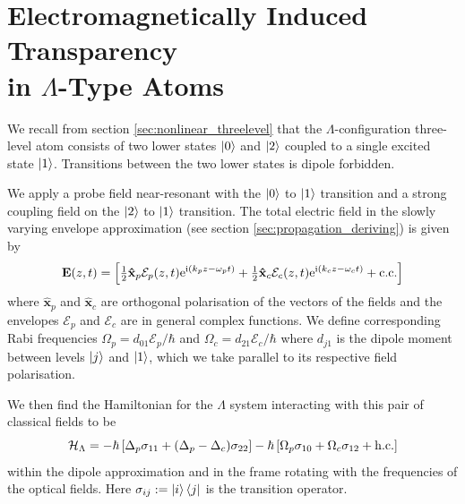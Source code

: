 \section[Electromagnetically Induced Transparency in $\Lambda$-Type Atoms]
  {Electromagnetically Induced Transparency\\ in $\Lambda$-Type Atoms}
  \label{sec:polaritons_eit}

    We recall from section \ref{sec:nonlinear_threelevel} that the
    $\Lambda$-configuration three-level atom consists of two lower states
    $\Ket{0}$ and $\Ket{2}$ coupled to a single excited state $\Ket{1}$.
    Transitions between the two lower states is dipole forbidden.

    We apply a probe field near-resonant with the $\Ket{0}$ to $\Ket{1}$
    transition and a strong coupling field on the $\Ket{2}$ to $\Ket{1}$
    transition. The total electric field in the slowly varying envelope
    approximation (see section \ref{sec:propagation_deriving}) is given by 
    \begin{equation}
      \mathbf{E}(z,t) = \left[ \tfrac{1}{2} \mathbf{\hat{x}}_p 
        \mathcal{E}_p(z,t) \mathrm{e}^{\mathrm{i}(k_p z - \omega_p t)} + 
        \tfrac{1}{2} \mathbf{\hat{x}}_c \mathcal{E}_c(z,t) \mathrm{e}^{\mathrm{i}(k_c z -
        \omega_c t)} + \mathrm{c.c.} \right]
      \label{eqn:lambda_field}
    \end{equation}
   where $\mathbf{\hat{x}}_p$ and $\mathbf{\hat{x}}_c$ are orthogonal
    polarisation of the vectors of the fields and the envelopes $\mathcal{E}_p$
    and $\mathcal{E}_c$ are in general complex functions. We define
    corresponding Rabi frequencies $\Omega_p = d_{01}\mathcal{E}_p/\hbar$ and
    $\Omega_c = d_{21}\mathcal{E}_c/\hbar$ where $d_{j1}$ is the dipole moment
    between levels $\Ket{j}$ and $\Ket{1}$, which we take parallel to its
    respective field polarisation.

    We then find the Hamiltonian for the $\Lambda$ system interacting with this
    pair of classical fields to be\cite{Fleischhauer2005}
    \begin{equation}
      \mathcal{H}_\mathrm{\Lambda} = -\hbar \left[ \Delta_p \sigma_{11} + 
        (\Delta_p - \Delta_c) \sigma_{22} \right] - \hbar \left[ \Omega_p 
        \sigma_{10} + \Omega_c \sigma_{12} + \mathrm{h.c.} \right]
      \label{eqn:lamda_hamiltonian}
    \end{equation}
    within the dipole approximation and in the frame rotating with the
    frequencies of the optical fields. Here $\sigma_{ij} := \Ket{i}\Bra{j}$ is
    the transition operator.

